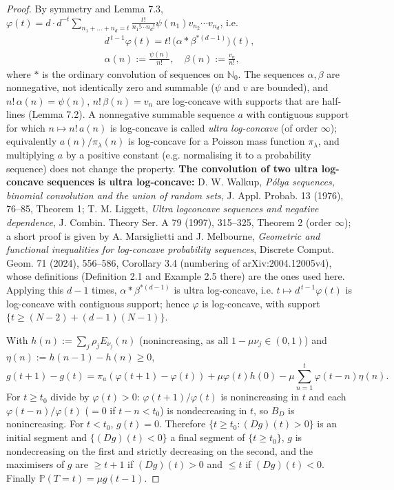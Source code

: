 \documentclass[11pt,a4paper]{article}
\theoremstyle{definition}
\theoremstyle{remark}
\begin{document}
\begin{proof}
By symmetry and Lemma 7.3, $\varphi(t)=d\cdot d^{-t}\sum_{n_1+\dots+n_d=t}\frac{t!}{n_1!\cdots n_d!}\psi(n_1)v_{n_2}\cdots v_{n_d}$, i.e.
\begin{gather*}
d^{\,t-1}\varphi(t)=t!\,\bigl(\alpha*\beta^{*(d-1)}\bigr)(t), \\
\alpha(n):=\frac{\psi(n)}{n!},\quad \beta(n):=\frac{v_n}{n!},
\end{gather*}
where $*$ is the ordinary convolution of sequences on $\mathbb N_0$. The sequences $\alpha,\beta$ are nonnegative, not identically zero and summable ($\psi$ and $v$ are bounded), and $n!\,\alpha(n)=\psi(n)$, $n!\,\beta(n)=v_n$ are log-concave with supports that are half-lines (Lemma 7.2). A nonnegative summable sequence $a$ with contiguous support for which $n\mapsto n!\,a(n)$ is log-concave is called \emph{ultra log-concave} (of order $\infty$); equivalently $a(n)/\pi_\lambda(n)$ is log-concave for a Poisson mass function $\pi_\lambda$, and multiplying $a$ by a positive constant (e.g. normalising it to a probability sequence) does not change the property. \textbf{The convolution of two ultra log-concave sequences is ultra log-concave:} D. W. Walkup, \emph{Pólya sequences, binomial convolution and the union of random sets}, J. Appl. Probab. 13 (1976), 76–85, Theorem 1; T. M. Liggett, \emph{Ultra logconcave sequences and negative dependence}, J. Combin. Theory Ser. A 79 (1997), 315–325, Theorem 2 (order $\infty$); a short proof is given by A. Marsiglietti and J. Melbourne, \emph{Geometric and functional inequalities for log-concave probability sequences}, Discrete Comput. Geom. 71 (2024), 556–586, Corollary 3.4 (numbering of arXiv:2004.12005v4), whose definitions (Definition 2.1 and Example 2.5 there) are the ones used here. Applying this $d-1$ times, $\alpha*\beta^{*(d-1)}$ is ultra log-concave, i.e. $t\mapsto d^{\,t-1}\varphi(t)$ is log-concave with contiguous support; hence $\varphi$ is log-concave, with support $\{t\ge(N-2)+(d-1)(N-1)\}$.

With $h(n):=\sum_j\rho_jE_{\nu_j}(n)$ (nonincreasing, as all $1-\mu\nu_j\in(0,1)$) and $\eta(n):=h(n-1)-h(n)\ge0$,
\begin{equation*}
g(t+1)-g(t)=\pi_a(\varphi(t+1)-\varphi(t))+\mu\varphi(t)h(0)-\mu\sum_{n=1}^t\varphi(t-n)\eta(n).
\end{equation*}
For $t\ge t_0$ divide by $\varphi(t)>0$: $\varphi(t+1)/\varphi(t)$ is nonincreasing in $t$ and each $\varphi(t-n)/\varphi(t)$ ($=0$ if $t-n<t_0$) is nondecreasing in $t$, so $B_D$ is nonincreasing. For $t<t_0$, $g(t)=0$. Therefore $\{t\ge t_0:(Dg)(t)>0\}$ is an initial segment and $\{(Dg)(t)<0\}$ a final segment of $\{t\ge t_0\}$, $g$ is nondecreasing on the first and strictly decreasing on the second, and the maximisers of $g$ are $\ge t+1$ if $(Dg)(t)>0$ and $\le t$ if $(Dg)(t)<0$. Finally $\mathbb P(T=t)=\mu g(t-1)$.
\end{proof}
\end{document}
